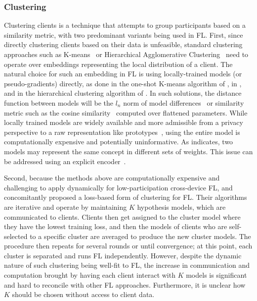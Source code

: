 \subsubsection{Clustering}
Clustering clients is a technique that attempts to group participants based on a similarity metric, with two predominant variants being used in FL.  First, since directly clustering clients based on their data is unfeasible, standard clustering approaches such as K-means~\citep{K-means} or Hierarchical Agglomerative Clustering~\citep{OgHierClustering} need to operate over embeddings representing the local distribution of a client. The natural choice for such an embedding in FL is using locally-trained models (or pseudo-gradients) directly, as done in the one-shot K-means algorithm of \citet{AnEfficientFrameworkForClusteredFL}, in \citet{ClusteredFederatedLearningModelAgnostic}, and in the hierarchical clustering algorithm of \citet{HierClustering}. In such solutions, the distance function between models will be the $l_n$ norm of model differences~\citep{AnEfficientFrameworkForClusteredFL,HierClustering} or similarity metric such as the cosine similarity~\citep{ClusteredFederatedLearningModelAgnostic,Auxo,HierClustering} computed over flattened parameters. While locally trained models are widely available and more admissible from a privacy perspective to a raw representation like prototypes~\citep{FedProto}, using the entire model is computationally expensive and potentially uninformative. As \citet{FedMA} indicates, two models may represent the same concept in different sets of weights. This issue can be addressed using an explicit encoder~\citep{CommunityBasedFL}.

Second, because the methods above are computationally expensive and challenging to apply dynamically for low-participation cross-device FL, \citet{AnEfficientFrameworkForClusteredFL} and \citet{ThreeApproachesMansour} concomitantly proposed a loss-based form of clustering for FL\@. Their algorithms are iterative and operate by maintaining $K$ hypothesis models, which are communicated to clients. Clients then get assigned to the cluster model where they have the lowest training loss, and then the models of clients who are self-selected to a specific cluster are averaged to produce the new cluster models. The procedure then repeats for several rounds or until convergence; at this point, each cluster is separated and runs FL independently. However, despite the dynamic nature of such clustering being well-fit to FL, the increase in communication and computation brought by having each client interact with $K$ models is significant and hard to reconcile with other FL approaches. Furthermore, it is unclear how $K$ should be chosen without access to client data.
\clearpage


